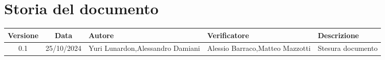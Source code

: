 \section{Storia del documento}
\begin{center}
    \begin{tabular}{ c c p{} p{} p{3cm} }
        \rowcolor{gray!20}\rule{0pt}{0.5cm}\textbf{Versione} & \textbf{Data} & \textbf{Autore} & \textbf{Verificatore} & \textbf{Descrizione} \\[0.7ex]
        \hline
        \rule{0pt}{0.5cm}0.1 & 25/10/2024 & Yuri Lunardon,\newline Alessandro Damiani  & Alessio Barraco,\newline Matteo Mazzotti & Stesura documento\\[0.7ex]
        
    \end{tabular}
\end{center}
